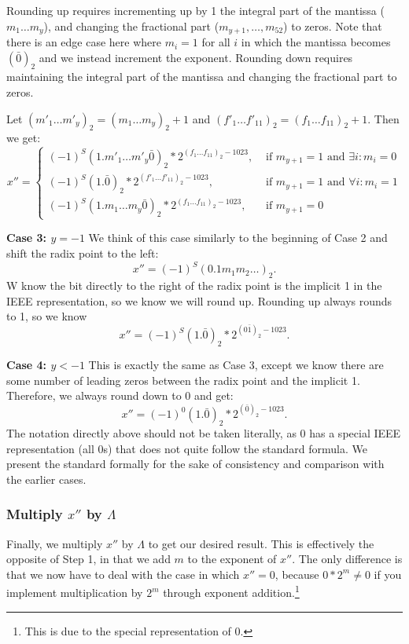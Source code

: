 \documentclass[11pt]{scrartcl} %
\begin{document}
Rounding up requires incrementing up by 1 the integral part of the mantissa ($m_1 \hdots m_y$), and changing the fractional part ($m_{y+1}, \hdots, m_{52}$) to zeros. Note that there is an edge case here where $m_i = 1$ for all $i$ in which the mantissa becomes $(\bar{0})_2$ and we instead increment the exponent. Rounding down requires maintaining the integral part of the mantissa and changing the fractional part to zeros. \newline

Let $(m'_1 \hdots m'_y)_2 = (m_1 \hdots m_y)_2 + 1$ and $(f'_1 \hdots f'_{11})_2 = (f_1 \hdots f_{11})_2 + 1$. Then we get:
\begin{equation}
    x'' =
        \begin{cases}
            (-1)^S (1.m'_1 \hdots m'_y \bar{0})_2 * 2^{(f_1 \hdots f_{11})_2-1023}, & \text{ if } m_{y+1} = 1 \text{ and } \exists i: m_i = 0 \\
            (-1)^S (1.\bar{0})_2 * 2^{(f'_1 \hdots f'_{11})_2-1023}, & \text{ if } m_{y+1} = 1 \text{ and } \forall i: m_i = 1 \\
            (-1)^S (1.m_1 \hdots m_y \bar{0})_2 * 2^{(f_1 \hdots f_{11})_2-1023}, & \text{ if } m_{y+1} = 0
        \end{cases}
\end{equation}

\textbf{Case 3: $y = -1$} \newline
We think of this case similarly to the beginning of Case 2 and shift the radix point to the left:
\[ x'' = (-1)^S (0.1m_1 m_2 \hdots)_2. \]
W know the bit directly to the right of the radix point is the implicit 1 in the IEEE representation, so we know we will round up. Rounding up always rounds to 1, so we know
\[ x'' = (-1)^S (1.\bar{0})_2 * 2^{(0\bar{1})_2 - 1023}. \]

\textbf{Case 4: $y < -1$} \newline
This is exactly the same as Case 3, except we know there are some number of leading zeros between the radix point and the implicit 1. Therefore, we always round down to 0 and get:
\[ x'' = (-1)^0 (1.\bar{0})_2 * 2^{(\bar{0})_2 - 1023}. \]
The notation directly above should not be taken literally, as 0 has a special IEEE representation (all 0s) that does not quite follow the standard formula. We present the standard formally for the sake of consistency and comparison with the earlier cases. \newline

\subsubsection{Multiply $x''$ by $\Lambda$}
\label{subsubsec:multiply_xdoubleprime}
Finally, we multiply $x''$ by $\Lambda$ to get our desired result. This is effectively the opposite of Step 1, in that we add $m$ to the exponent of $x''$. The only difference is that we now have to deal with the case in which $x'' = 0$, because $0*2^m \neq 0$ if you implement multiplication by $2^m$ through exponent addition.\footnote{This is due to the special representation of 0.}
\end{document}
